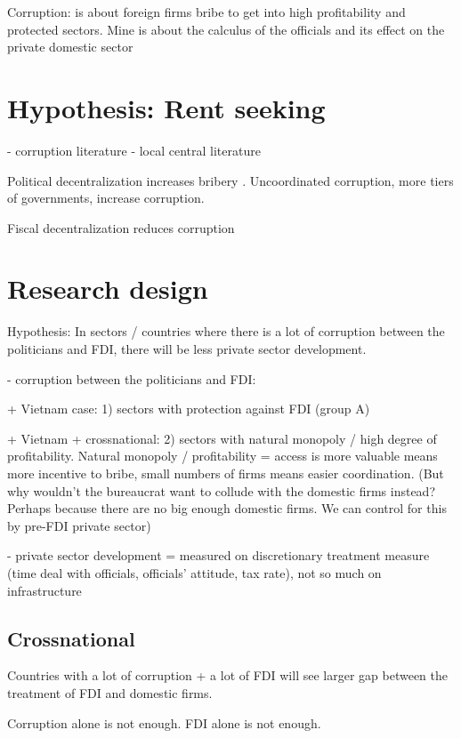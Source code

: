 \documentclass[12pt]{article}
\begin{document}
Corruption: \citep{Malesky2015} is about foreign firms bribe to get into high profitability and protected sectors. Mine is about the calculus of the officials and its effect on the private domestic sector


\section{Hypothesis: Rent seeking}

- corruption literature
- local central literature

Political decentralization increases bribery \citep{Fan2009}. Uncoordinated corruption, more tiers of governments, increase corruption.

Fiscal decentralization reduces corruption \citep{Guerra2009}

\section{Research design}

Hypothesis: In sectors / countries where there is a lot of corruption between the politicians and FDI, there will be less private sector development.

- corruption between the politicians and FDI: 

+ Vietnam case: 1) sectors with protection against FDI (group A) 

+ Vietnam + crossnational: 2) sectors with natural monopoly / high degree of profitability. Natural monopoly / profitability = access is more valuable means more incentive to bribe, small numbers of firms means easier coordination. (But why wouldn't the bureaucrat want to collude with the domestic firms instead? Perhaps because there are no big enough domestic firms. We can control for this by pre-FDI private sector)


- private sector development = measured on discretionary treatment measure (time deal with officials, officials' attitude, tax rate), not so much on infrastructure

\subsection{Crossnational}

Countries with a lot of corruption + a lot of FDI will see larger gap between the treatment of FDI and domestic firms.

Corruption alone is not enough. FDI alone is not enough.
\end{document}
